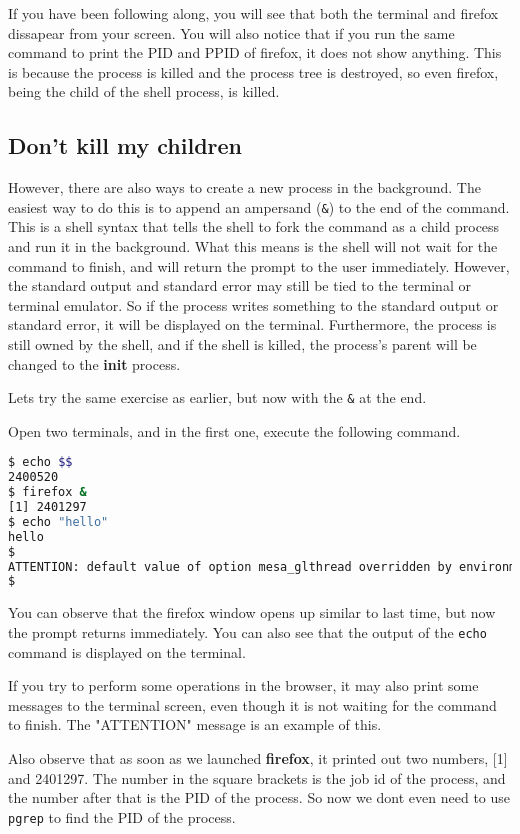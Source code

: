If you have been following along, you will see that both the terminal and firefox
dissapear from your screen. You will also notice that if you run the same
command to print the PID and PPID of firefox, it does not show anything.
This is because the process is killed and the process tree is destroyed, so
even firefox, being the child of the shell process, is killed.

\subsection{Don't kill my children}

However, there are also ways to create a new process in the background.
The easiest way to do this is to append an ampersand (\lstinline|&|) to the
end of the command. This is a shell syntax that tells the shell to fork the
command as a child process and run it in the background. What this means is
the shell will not wait for the command to finish, and will return the prompt
to the user immediately. However, the standard output and standard error may
still be tied to the terminal or terminal emulator. So if the process writes
something to the standard output or standard error, it will be displayed on the
terminal. Furthermore, the process is still owned by the shell, and if the shell
is killed, the process's parent will be changed to the \textbf{init} process.

Lets try the same exercise as earlier, but now with the \lstinline|&| at the end.

Open two terminals, and in the first one, execute the following command.

\begin{lstlisting}[language=bash]
$ echo $$
2400520
$ firefox &
[1] 2401297
$ echo "hello"
hello
$
ATTENTION: default value of option mesa_glthread overridden by environment.
$
\end{lstlisting}

You can observe that the firefox window opens up similar to last time, but
now the prompt returns immediately. You can also see that the output of the
\lstinline|echo| command is displayed on the terminal.

If you try to perform some operations in the browser, it may also print
some messages to the terminal screen, even though it is not waiting for
the command to finish. The "ATTENTION" message is an example of this.

Also observe that as soon as we launched \textbf{firefox}, it printed out
two numbers, [1] and 2401297. The number in the square brackets is the job
id of the process, and the number after that is the PID of the process.
So now we dont even need to use \lstinline|pgrep| to find the PID of the process.

